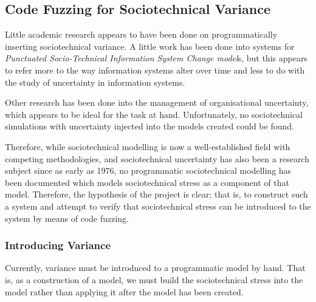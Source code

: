 \documentclass[11pt, twocolumn]{article}
\begin{document}
\subsection{Code Fuzzing for Sociotechnical Variance}
Little academic research appears to have been done on programmatically inserting sociotechnical variance. A little work has been done into systems for \emph{Punctuated Socio-Technical Information System Change model}s\cite{Lyytinen2008}, but this appears to refer more to the way information systems alter over time and less to do with the study of uncertainty in information systems. \par
Other research has been done into the management of organisational uncertainty\cite{Grote2004}\cite{Herrmann1999}, which appears to be ideal for the task at hand. Unfortunately, no sociotechnical simulations with uncertainty injected into the models created could be found. \par
Therefore, while sociotechnical modelling is now a well-established field with competing methodologies, and sociotechnical uncertainty has also been a research subject since as early as 1976\cite{Susman1976}, no programmatic sociotechnical modelling has been documented which models sociotechnical stress as a component of that model. Therefore, the hypothesis of the project is clear; that is, to construct such a system and attempt to verify that sociotechnical stress can be introduced to the system by means of code fuzzing. \par

\subsubsection{Introducing Variance}
\label{Variance_research}
Currently, variance must be introduced to a programmatic model by hand. That is, as a construction of a model, we must build the sociotechnical stress into the model rather than applying it after the model has been created. \par
\end{document}
